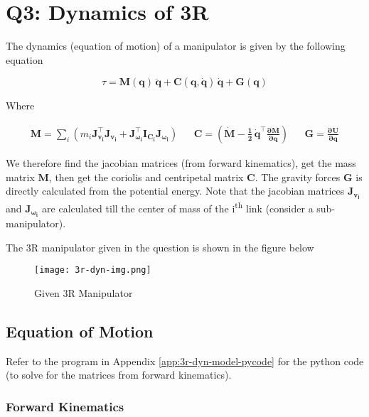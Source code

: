 
\section{Q3: Dynamics of 3R}

The dynamics (equation of motion) of a manipulator is given by the following equation

\begin{equation}
    \tau = \mathbf{M(q) \, \ddot{q} + C(q, \dot{q}) \, \dot{q} + G(q)}
    \label{eq:robot-dynamics-eq}
\end{equation}

Where

\begin{align}
    \mathbf{M} = \sum_i \left ( m_i \mathbf{J_{v_i}^\top J_{v_i} + J_{\omega_i}^\top I_{C_i} J_{\omega_i}} \right )
    &&
    \mathbf{C} = \left ( \mathbf{ \dot{M} - \frac{1}{2} \, \dot{q}^\top \frac{\partial M}{\partial q} } \right )
    &&
    \mathbf{G} = \mathbf{ \frac{\partial U}{\partial q}}
    \label{eq:robot-dynamics-eq-terms}
\end{align}

We therefore find the jacobian matrices (from forward kinematics), get the mass matrix $\mathbf{M}$, then get the coriolis and centripetal matrix $\mathbf{C}$. The gravity forces $\mathbf{G}$ is directly calculated from the potential energy. Note that the jacobian matrices $\mathbf{J_{v_i}}$ and $\mathbf{J_{\omega_i}}$ are calculated till the center of mass of the i\textsuperscript{th} link (consider a sub-manipulator).

The 3R manipulator given in the question is shown in the figure below

\begin{figure}[h]
    \centering
    \texttt{[image: 3r-dyn-img.png]}
    \caption{Given 3R Manipulator}
\end{figure}

\subsection{Equation of Motion}

Refer to the program in Appendix \ref{app:3r-dyn-model-pycode} for the python code (to solve for the matrices from forward kinematics).

\subsubsection*{Forward Kinematics}

